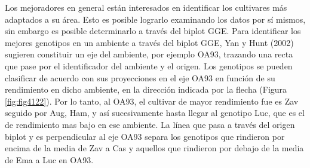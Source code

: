 \begin{itemize}[wide, nosep, labelindent = 0pt, topsep = 1ex, noitemsep,topsep=0pt]
Los mejoradores en general están interesados en identificar los cultivares más adaptados a su área. Esto es posible lograrlo examinando los datos por sí mismos, sin embargo es posible determinarlo a través del biplot GGE. Para identificar los mejores genotipos en un ambiente a través del biplot GGE, Yan y Hunt (2002) sugieren constituir un eje del ambiente, por ejemplo OA93, trazando una recta que pase por el identificador del ambiente y el origen. Los genotipos se pueden clasificar de acuerdo con sus proyecciones en el eje OA93 en función de su rendimiento en dicho ambiente, en la dirección indicada por la flecha (Figura \ref{fig:fig4122}). Por lo tanto, al OA93, el cultivar de mayor rendimiento fue es Zav seguido por Aug, Ham, y así sucesivamente hasta llegar al genotipo Luc, que es el de rendimiento mas bajo en ese ambiente. La línea que pasa a través del origen biplot y es perpendicular al eje OA93 separa los genotipos que rindieron por encima de la media de Zav a Cas y aquellos que rindieron por debajo de la media de Ema a Luc en OA93.\\ 



\end{itemize}
